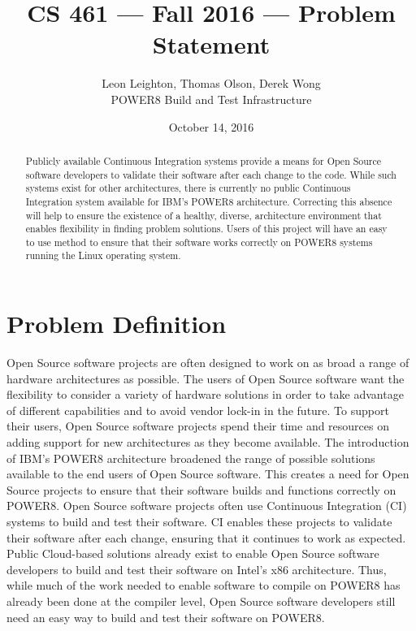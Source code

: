 \documentclass[10pt,letterpaper,onecolumn,draftclsnofoot]{IEEEtran}
\begin{document}
\begin{titlepage}
  \title{CS 461 --- Fall 2016 --- Problem Statement}
  \author{Leon Leighton, Thomas Olson, Derek Wong\\POWER8 Build and Test Infrastructure}
  \date{October 14, 2016}
  \maketitle
  \vspace{4cm}
  \begin{abstract}
  \noindent Publicly available Continuous Integration systems provide a means for Open Source software developers to validate their software after each change to the code.
  While such systems exist for other architectures, there is currently no public Continuous Integration system available for IBM's POWER8 architecture. 
  Correcting this absence will help to ensure the existence of a healthy, diverse, architecture environment that enables flexibility in finding problem solutions. 
  Users of this project will have an easy to use method to ensure that their software works correctly on POWER8 systems running the Linux operating system.
  \end{abstract}
\end{titlepage}

\section*{Problem Definition}
Open Source software projects are often designed to work on as broad a range of hardware architectures as possible. 
The users of Open Source software want the flexibility to consider a variety of hardware solutions in order to take advantage of different capabilities and to avoid vendor lock-in in the future. 
To support their users, Open Source software projects spend their time and resources on adding support for new architectures as they become available. 
The introduction of IBM's POWER8 architecture broadened the range of possible solutions available to the end users of Open Source software. 
This creates a need for Open Source projects to ensure that their software builds and functions correctly on POWER8. 
Open Source software projects often use Continuous Integration (CI) systems to build and test their software. 
CI enables these projects to validate their software after each change, ensuring that it continues to work as expected. 
Public Cloud-based solutions already exist to enable Open Source software developers to build and test their software on Intel's x86 architecture. 
Thus, while much of the work needed to enable software to compile on POWER8 has already been done at the compiler level, Open Source software developers still need an easy way to build and test their software on POWER8. 
\end{document}
